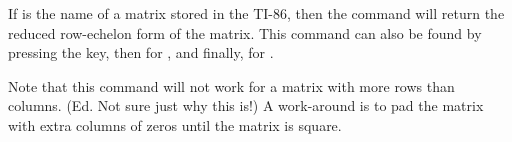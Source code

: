 If  is the name of a matrix stored in the TI-86, then the command  will return the reduced row-echelon form of the matrix.  This command can also be found by pressing the  key, then  for , and finally,  for .\par
%
Note that this command will not work for a matrix with more rows than columns.  (Ed. Not sure just why this is!)  A work-around is to pad the matrix with extra columns of zeros until the matrix is square.
